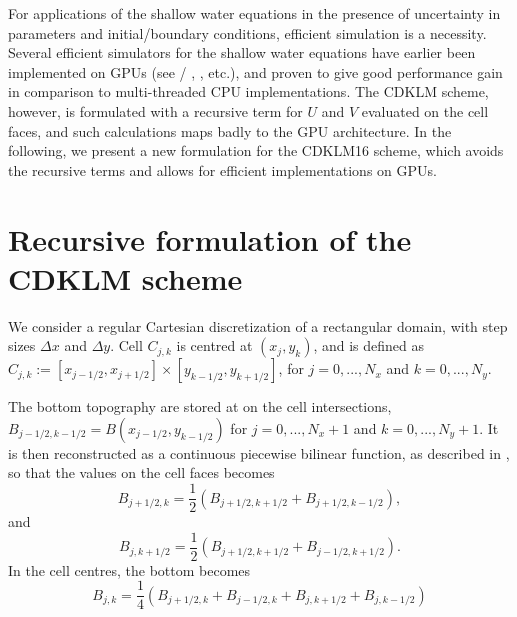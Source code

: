 \documentclass[11pt, a4paper]{article}
\newcommand{\red}[1]{{\color{red}#1}}
\newcommand{\eastface}[1]{#1_{j + 1/2, k}}
\newcommand{\westface}[1]{#1_{j - 1/2, k}}
\newcommand{\northface}[1]{#1_{j, k + 1/2}}
\newcommand{\southface}[1]{#1_{j, k - 1/2}}
\begin{document}
For applications of the shallow water equations in the presence of uncertainty in parameters and initial/boundary conditions, efficient simulation is a necessity.
Several efficient simulators for the shallow water equations have earlier been implemented on GPUs (see \cite{brodtkorb_etal_10_cvs}/ \cite{brodtkorb_etal_11_caf}, \cite{horvath_kepplerShuffle_2016}, \red{etc.}), and proven to give good performance gain in comparison to multi-threaded CPU implementations.
The CDKLM scheme, however, is formulated with a recursive term for $U$ and $V$ evaluated on the cell faces, and such calculations maps badly to the GPU architecture. 
In the following, we present a new formulation for the CDKLM16 scheme, which avoids the recursive terms and allows for efficient implementations on GPUs.


\section{Recursive formulation of the CDKLM scheme}
We consider a regular Cartesian discretization of a rectangular domain, with step sizes $\Delta x$ and $\Delta y$. 
Cell $C_{j,k}$ is centred at $(x_j, y_k)$, and is defined as $C_{j,k} := [x_{j-1/2}, x_{j+1/2}] \times [y_{k-1/2}, y_{k+1/2}]$, for $j = 0, ..., N_x$ and $k = 0, ..., N_y$.

The bottom topography are stored at on the cell intersections, $B_{j-1/2, k-1/2} = B(x_{j-1/2}, y_{k-1/2})$ for $j = 0, ..., N_x +1$ and $k = 0,..., N_y +1$.
It is then reconstructed as a continuous piecewise bilinear function, as described in \cite{kurganovPetrova2007}, so that the values on the cell faces becomes
\begin{equation}
	\eastface{B} = \frac{1}{2}(B_{j+1/2, k+1/2} + B_{j+1/2, k-1/2}),
	\label{eq:Bxfaces}
\end{equation}
and\begin{equation}
	\northface{B} = \frac{1}{2}(B_{j+1/2, k+1/2} + B_{j-1/2, k+1/2}).
	\label{eq:Byfaces}
\end{equation}
In the cell centres, the bottom becomes 
\begin{equation}
	B_{j,k} = \frac{1}{4} \left( \eastface{B} + \westface{B}+ \northface{B} + \southface{B} \right)
	\label{eq:Bm}
\end{equation}
\end{document}
